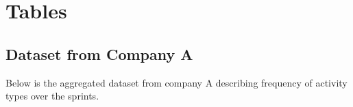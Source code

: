 %
%
%

\appendix

\chapter{Tables}
\label{introA} %

\section{Dataset from Company A}

Below is the aggregated dataset from company A describing frequency of activity types over the sprints.

